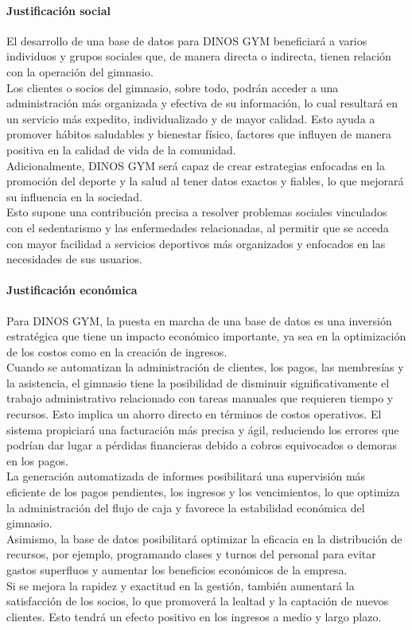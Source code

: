 \documentclass[12pt, letterpaper]{article}
\begin{document}
\paragraph{Justificación social}
El desarrollo de una base de datos para DINOS GYM beneficiará a varios individuos y grupos sociales que, de manera directa o indirecta, tienen relación con la operación del gimnasio.\\ 
Los clientes o socios del gimnasio, sobre todo, podrán acceder a una administración más organizada y efectiva de su información, lo cual resultará en un servicio más expedito, individualizado y de mayor calidad. Esto ayuda a promover hábitos saludables y bienestar físico, factores que influyen de manera positiva en la calidad de vida de la comunidad.\\
Adicionalmente, DINOS GYM será capaz de crear estrategias enfocadas en la promoción del deporte y la salud al tener datos exactos y fiables, lo que mejorará su influencia en la sociedad.\\ 
Esto supone una contribución precisa a resolver problemas sociales vinculados con el sedentarismo y las enfermedades relacionadas, al permitir que se acceda con mayor facilidad a servicios deportivos más organizados y enfocados en las necesidades de sus usuarios.
\newpage
\paragraph{Justificación económica}
Para DINOS GYM, la puesta en marcha de una base de datos es una inversión estratégica que tiene un impacto económico importante, ya sea en la optimización de los costos como en la creación de ingresos.\\ 
Cuando se automatizan la administración de clientes, los pagos, las membresías y la asistencia, el gimnasio tiene la posibilidad de disminuir significativamente el trabajo administrativo relacionado con tareas manuales que requieren tiempo y recursos. Esto implica un ahorro directo en términos de costos operativos.
El sistema propiciará una facturación más precisa y ágil, reduciendo los errores que podrían dar lugar a pérdidas financieras debido a cobros equivocados o demoras en los pagos.\\ 
La generación automatizada de informes posibilitará una supervisión más eficiente de los pagos pendientes, los ingresos y los vencimientos, lo que optimiza la administración del flujo de caja y favorece la estabilidad económica del gimnasio.\\
Asimismo, la base de datos posibilitará optimizar la eficacia en la distribución de recursos, por ejemplo, programando clases y turnos del personal para evitar gastos superfluos y aumentar los beneficios económicos de la empresa.\\ 
Si se mejora la rapidez y exactitud en la gestión, también aumentará la satisfacción de los socios, lo que promoverá la lealtad y la captación de nuevos clientes. Esto tendrá un efecto positivo en los ingresos a medio y largo plazo.
\newpage
\end{document}
